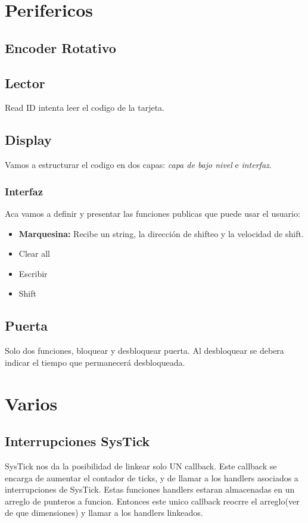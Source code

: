 \documentclass[10pt,a4paper]{article}
\author{Lisandro Alvarez}
\begin{document}
\section{Perifericos}
\subsection{Encoder Rotativo}

\subsection{Lector}
Read ID intenta leer el codigo de la tarjeta. 
\subsection{Display}
Vamos a estructurar el codigo en dos capas: \emph{capa de bajo nivel} e \emph{interfaz}.
\subsubsection{Interfaz}
Aca vamos a definir y presentar las funciones publicas que puede usar el usuario:
\begin{itemize}
\item \textbf{Marquesina: }Recibe un string, la dirección de shifteo y la velocidad de shift. 
\item Clear all
\item Escribir
\item Shift
\end{itemize}
\subsection{Puerta}
Solo dos funciones, bloquear y desbloquear puerta. Al desbloquear se debera indicar el tiempo que permanecerá desbloqueada.
\section{Varios}
\subsection{Interrupciones SysTick}
SysTick nos da la posibilidad de linkear solo UN callback. Este callback se encarga de aumentar el contador de ticks, y de llamar a los handlers asociados a interrupciones de SysTick. Estas funciones handlers estaran almacenadas en un arreglo de punteros a funcion. Entonces este unico callback reocrre el arreglo(ver de que dimensiones) y llamar a los handlers linkeados.
\end{document}
